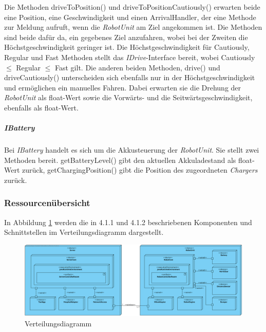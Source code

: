     		Die Methoden driveToPosition() und driveToPositionCautiously() erwarten beide eine Position, eine Geschwindigkeit und einen ArrivalHandler, der eine Methode zur Meldung aufruft, wenn die \emph{RobotUnit} am Ziel angekommen ist.
    		Die Methoden sind beide dafür da, ein gegebenes Ziel anzufahren, wobei bei der Zweiten die Höchstgeschwindigkeit geringer ist.
    		Die Höchstgeschwindigkeit für Cautiously, Regular und Fast Methoden stellt das \emph{IDrive}-Interface bereit, wobei Cautiously $\leq$ Regular $\leq$ Fast gilt.
    		Die anderen beiden Methoden, drive() und driveCautiously() unterscheiden sich ebenfalls nur in der Höchstgeschwindigkeit und ermöglichen ein manuelles Fahren.
    		Dabei erwarten sie die Drehung der \emph{RobotUnit} als float-Wert sowie die Vorwärts- und die Seitwärtsgeschwindigkeit, ebenfalls als float-Wert.
    	\subparagraph{IBattery}\label{ibattery}
    		Bei \emph{IBattery} handelt es sich um die Akkusteuerung der \emph{RobotUnit}.
    		Sie stellt zwei Methoden bereit.
    		getBatteryLevel() gibt den aktuellen Akkuladestand als float-Wert zurück, getChargingPosition() gibt die Position des zugeordneten \emph{Chargers} zurück.


\pagebreak
\subsubsection{Ressourcenübersicht}
    In Abbildung \ref{fig:4-1-3-verteilungsdiagramm} werden die in 4.1.1 und 4.1.2 beschriebenen
    Komponenten und Schnittstellen im Verteilungsdiagramm dargestellt.

    \begin{figure}[H]
      \centering
      \includegraphics[width=1.25\textwidth, angle=90]{img/2-Analyse-4-Produktumgebung}
      \caption{Verteilungsdiagramm}
      \label{fig:4-1-3-verteilungsdiagramm}
    \end{figure}
